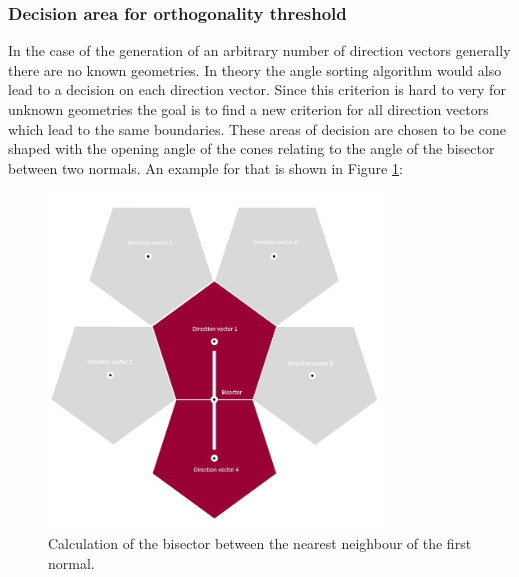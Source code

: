\subsubsection{Decision area for orthogonality threshold}
\label{decison_orthonolatiy}

In the case of the generation of an arbitrary number of direction vectors generally there are no known geometries. In theory the angle sorting algorithm would also lead to a decision on each direction vector. Since this criterion is hard to very for unknown geometries the goal is to find a new criterion for all direction vectors which lead to the same boundaries. These areas of decision are chosen to be cone shaped with the opening angle of the cones relating to the angle of the bisector between two normals. An example for that is shown in Figure \ref{decision_arbitrary_bisec}:


\begin{figure}[H]
    \centering
    \includegraphics[width=0.8\textwidth]{Graphics/decision_area_calc_bisector.jpg}
    \caption{Calculation of the bisector between the nearest neighbour of the first normal.}
    \label{decision_arbitrary_bisec}
\end{figure}

